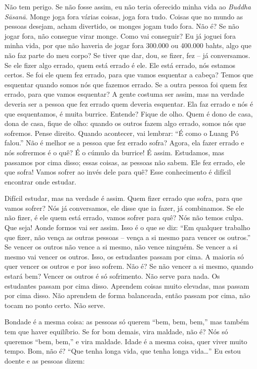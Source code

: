 Não tem perigo. Se não fosse assim, eu não teria oferecido minha
vida ao \emph{Buddha Sāsanā}. Monge joga fora várias coisas, joga
fora tudo. Coisas que no mundo as pessoas desejam, acham divertido, os
monges jogam tudo fora. Não é? Se não jogar fora, não consegue virar
monge. Como vai conseguir? Eu já joguei fora minha vida, por que não
haveria de jogar fora 300.000 ou 400.000 bahts, algo que não faz parte
do meu corpo? Se tiver que dar, dou, se fizer, fez – já conversamos. Se
ele fizer algo errado, quem está errado é ele. Ele está errado, nós
estamos certos. Se foi ele quem fez errado, para que vamos esquentar a
cabeça? Temos que esquentar quando somos nós que fazemos errado. Se a
outra pessoa foi quem fez errado, para que vamos esquentar? A gente
costuma ser assim, mas na verdade deveria ser a pessoa que fez errado
quem deveria esquentar. Ela faz errado e nós é que esquentamos, é muita
burrice. Entende? Fique de olho. Quem é dono de casa, dona de casa,
fique de olho: quando os outros fazem algo errado, somos nós que
sofremos. Pense direito. Quando acontecer, vai lembrar: “É como o Luang
Pó falou.” Não é melhor se a pessoa que fez errado sofra? Agora, ela
fazer errado e nós sofrermos é o quê? É o cúmulo da burrice! É assim.
Estudamos, mas passamos por cima disso; essas coisas, as pessoas não
sabem. Ele fez errado, ele que sofra! Vamos sofrer ao invés dele para
quê? Esse conhecimento é difícil encontrar onde estudar.

Difícil estudar, mas na verdade é assim. Quem fizer errado que
sofra, para que vamos sofrer? Nós já conversamos, ele disse que ia
fazer, já combinamos. Se ele não fizer, é ele quem está errado, vamos
sofrer para quê? Nós não temos culpa. Que seja! Aonde formos vai ser
assim. Isso é o que se diz: “Em qualquer trabalho que fizer, não vença
as outras pessoas – vença a si mesmo para vencer os outros.” Se vencer
os outros não vence a si mesmo, não vence ninguém. Se vencer a si mesmo
vai vencer os outros. Isso, os estudantes passam por cima. A maioria só
quer vencer os outros e por isso sofrem. Não é? Se não vencer a si
mesmo, quando estará bem? Vencer os outros é só sofrimento. Não serve
para nada. Os estudantes passam por cima disso. Aprendem coisas muito
elevadas, mas passam por cima disso. Não aprendem de forma balanceada,
então passam por cima, não tocam no ponto certo. Não serve.

Bondade é a mesma coisa: as pessoas só querem “bem, bem, bem,” mas
também tem que haver equilíbrio. Se for bom demais, vira maldade, não
é? Nós só queremos “bem, bem,” e vira maldade. Idade é a mesma coisa,
quer viver muito tempo. Bom, não é? “Que tenha longa vida, que tenha
longa vida\ldots{}” Eu estou doente e as pessoas dizem: 

